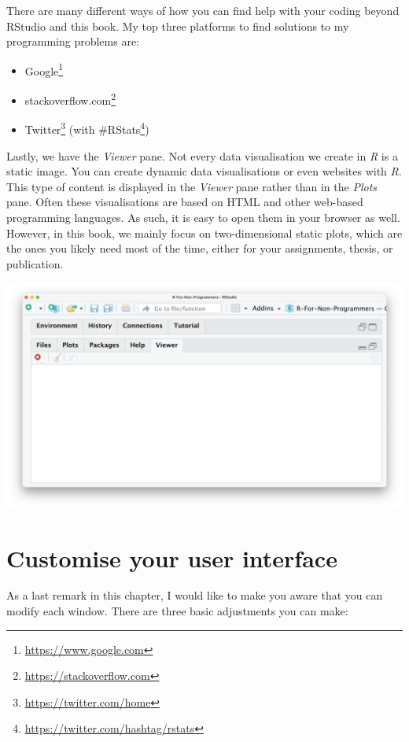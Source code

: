 \documentclass[
  letterpaper,
]{krantz}
\renewcommand{\href}[2]{#2\footnote{\url{#1}}}
\begin{document}
There are many different ways of how you can find help with your coding
beyond RStudio and this book. My top three platforms to find solutions
to my programming problems are:

\begin{itemize}
\item
  \href{https://www.google.com}{Google}
\item
  \href{https://stackoverflow.com}{stackoverflow.com}
\item
  \href{https://twitter.com/home}{Twitter} (with
  \href{https://twitter.com/hashtag/rstats}{\#RStats})
\end{itemize}

Lastly, we have the \emph{Viewer} pane. Not every data visualisation we
create in \emph{R} is a static image. You can create dynamic data
visualisations or even websites with \emph{R}. This type of content is
displayed in the \emph{Viewer} pane rather than in the \emph{Plots}
pane. Often these visualisations are based on HTML and other web-based
programming languages. As such, it is easy to open them in your browser
as well. However, in this book, we mainly focus on two-dimensional
static plots, which are the ones you likely need most of the time,
either for your assignments, thesis, or publication.

\includegraphics{images/chapter_04_img/05_files_plots_etc/05_rstudio_viewer.png}

\section{Customise your user
interface}\label{customise-your-user-interface}

As a last remark in this chapter, I would like to make you aware that
you can modify each window. There are three basic adjustments you can
make:
\end{document}
